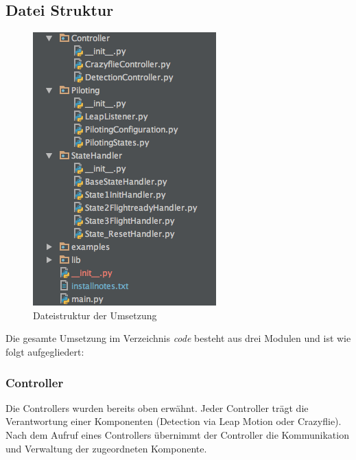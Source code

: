 \subsection{Datei Struktur}
\begin{figure}
	\includegraphics[width=1.0\linewidth]{figures/poc/filestructure.png}
	\caption{Dateistruktur der Umsetzung}
\end{figure}
Die gesamte Umsetzung im Verzeichnis \textit{code} besteht aus drei Modulen und ist wie folgt aufgegliedert:

\subsubsection{Controller}
Die Controllers wurden bereits oben erwähnt. Jeder Controller trägt die Verantwortung einer Komponenten (Detection via Leap Motion oder Crazyflie).
Nach dem Aufruf eines Controllers übernimmt der Controller die Kommunikation und Verwaltung der zugeordneten Komponente.

